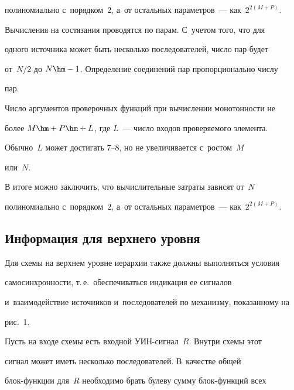 полиномиально с~порядком~2, а~от остальных параметров~--- как~$2^{2(M+P)}$.


   


   Вычисления на состязания проводятся по парам. С~учетом того, что для 


одного источника может быть несколько последователей, число пар будет 


от~$N/2$ до $N\hm-1$. Определение соединений пар пропорционально числу 


пар.


   


   Число аргументов проверочных функций при вычислении монотонности не 


более $M\hm+P\hm+L$, где $L$~--- число входов проверяемого элемента. 


Обычно~$L$ может достигать 7--8, но не увеличивается с~ростом~$M$ 


или~$N$.


   


   В итоге можно заключить, что вычислительные затраты зависят от~$N$ 


полиномиально с~порядком~2, а~от остальных параметров~--- как~$2^{2(M+P)}$.





\subsection{Информация для верхнего уровня}


       


   Для схемы на верхнем уровне иерархии также должны выполняться условия 


самосинхронности, т.\,е.\ обеспечиваться индикация ее сигналов 


и~взаимодействие источников и~последователей по механизму, показанному на 


рис.~1.


   


   Пусть на входе схемы есть входной УИН-сигнал~$R$. Внутри схемы этот 


сигнал может иметь несколько последователей. В~качестве общей  


блок-функ\-ции для~$R$ необходимо брать булеву сумму блок-функ\-ций всех 


